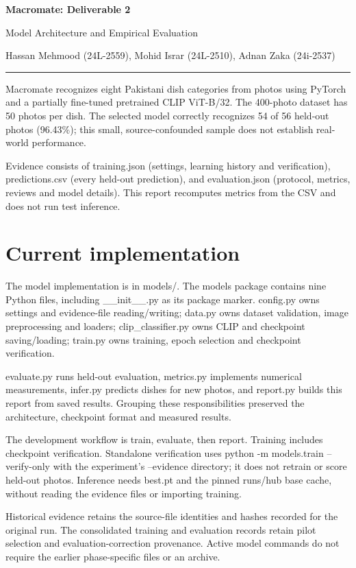 \documentclass[10pt,a4paper]{article}
\begin{document}
{\LARGE\bfseries Macromate: Deliverable 2\par}
{\large Model Architecture and Empirical Evaluation\par}
Hassan Mehmood (24L-2559), Mohid Israr (24L-2510), Adnan Zaka (24i-2537)\par
\smallskip\hrule\medskip
Macromate recognizes eight Pakistani dish categories from photos using PyTorch and a partially fine-tuned pretrained CLIP ViT-B/32. The 400-photo dataset has 50 photos per dish. The selected model correctly recognizes 54 of 56 held-out photos (96.43\%); this small, source-confounded sample does not establish real-world performance.

Evidence consists of training.json (settings, learning history and verification), predictions.csv (every held-out prediction), and evaluation.json (protocol, metrics, reviews and model details). This report recomputes metrics from the CSV and does not run test inference.

\section*{Current implementation}
The model implementation is in models/. The models package contains nine Python files, including \_\_init\_\_.py as its package marker. config.py owns settings and evidence-file reading/writing; data.py owns dataset validation, image preprocessing and loaders; clip\_classifier.py owns CLIP and checkpoint saving/loading; train.py owns training, epoch selection and checkpoint verification.

evaluate.py runs held-out evaluation, metrics.py implements numerical measurements, infer.py predicts dishes for new photos, and report.py builds this report from saved results. Grouping these responsibilities preserved the architecture, checkpoint format and measured results.

The development workflow is train, evaluate, then report. Training includes checkpoint verification. Standalone verification uses python -m models.train --verify-only with the experiment's --evidence directory; it does not retrain or score held-out photos. Inference needs best.pt and the pinned runs/hub base cache, without reading the evidence files or importing training.

Historical evidence retains the source-file identities and hashes recorded for the original run. The consolidated training and evaluation records retain pilot selection and evaluation-correction provenance. Active model commands do not require the earlier phase-specific files or an archive.
\end{document}
